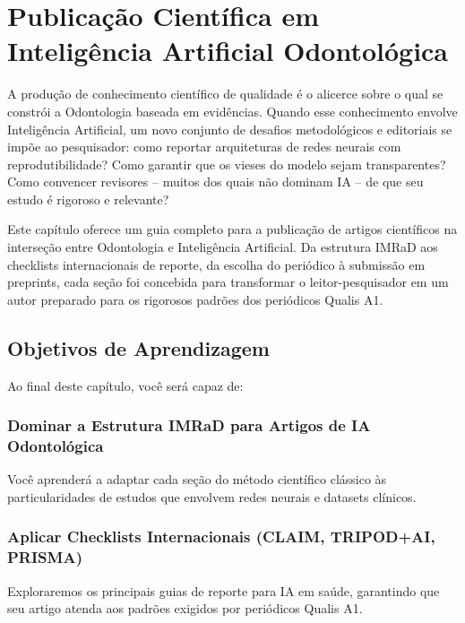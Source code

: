 \chapter{Publicação Científica em Inteligência Artificial Odontológica}
\label{cap:publicacao-cientifica}

\nivelquatro

A produção de conhecimento científico de qualidade é o alicerce sobre o qual se
constrói a Odontologia baseada em evidências. Quando esse conhecimento envolve
Inteligência Artificial, um novo conjunto de desafios metodológicos e editoriais
se impõe ao pesquisador: como reportar arquiteturas de redes neurais com
reprodutibilidade? Como garantir que os vieses do modelo sejam transparentes?
Como convencer revisores -- muitos dos quais não dominam IA -- de que seu estudo
é rigoroso e relevante?

Este capítulo oferece um guia completo para a publicação de artigos científicos
na interseção entre Odontologia e Inteligência Artificial. Da estrutura IMRaD
aos checklists internacionais de reporte, da escolha do periódico à submissão em
preprints, cada seção foi concebida para transformar o leitor-pesquisador em um
autor preparado para os rigorosos padrões dos periódicos Qualis A1.

  
 

\section{Objetivos de Aprendizagem}

Ao final deste capítulo, você será capaz de:

\subsection{Dominar a Estrutura IMRaD para Artigos de IA Odontológica}
Você aprenderá a adaptar cada seção do método científico clássico às particularidades de estudos que envolvem redes neurais e datasets clínicos.

\subsection{Aplicar Checklists Internacionais (CLAIM, TRIPOD+AI, PRISMA)}
Exploraremos os principais guias de reporte para IA em saúde, garantindo que seu artigo atenda aos padrões exigidos por periódicos Qualis A1.

